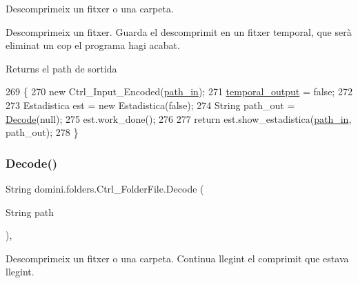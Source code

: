 Descomprimeix un fitxer o una carpeta. 

Descomprimeix un fitxer. Guarda el descomprimit en un fitxer temporal, que serà eliminat un cop el programa hagi acabat.

\begin{DoxyReturn}{Returns}
el path de sortida 
\end{DoxyReturn}

\begin{DoxyCode}
269                            \{
270         \textcolor{keyword}{new} Ctrl\_Input\_Encoded(\hyperlink{classdomini_1_1folders_1_1Ctrl__FolderFile_a0d3946bb2832a1f34d0c2227df5c71c4}{path\_in});
271         \hyperlink{classdomini_1_1folders_1_1Ctrl__FolderFile_a0db81590abe27b21a9b8c37633c86fa6}{temporal\_output} = \textcolor{keyword}{false};
272 
273         Estadistica est = \textcolor{keyword}{new} Estadistica(\textcolor{keyword}{false});
274         String path\_out = \hyperlink{classdomini_1_1folders_1_1Ctrl__FolderFile_a5d28ac7f5223ecd40a242148e86447c1}{Decode}(null);
275         est.work\_done();
276 
277         \textcolor{keywordflow}{return} est.show\_estadistica(\hyperlink{classdomini_1_1folders_1_1Ctrl__FolderFile_a0d3946bb2832a1f34d0c2227df5c71c4}{path\_in}, path\_out);
278     \}
\end{DoxyCode}
\mbox{\label{classdomini_1_1folders_1_1Ctrl__FolderFile_ababd536f11319589ce3c371e3701afc6}} 
\subsubsection{\texorpdfstring{Decode()}{Decode()}\hspace{0.1cm}{\footnotesize\ttfamily [2/2]}}
{\footnotesize\ttfamily String domini.\+folders.\+Ctrl\+\_\+\+Folder\+File.\+Decode (\begin{DoxyParamCaption}\item[{String}]{path }\end{DoxyParamCaption})\hspace{0.3cm}{\ttfamily [inline]}, {\ttfamily [private]}}



Descomprimeix un fitxer o una carpeta. Continua llegint el comprimit que estava llegint. 


